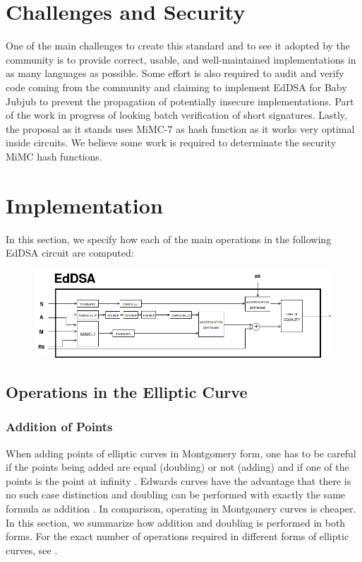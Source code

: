 \documentclass{article}
\begin{document}
\begin{spacing}{1.2}
\section{Challenges and Security}

One of the main challenges to create this standard and to see it adopted by the community is to provide correct, usable, and well-maintained implementations in as many languages as possible. 
%
Some effort is also required to audit and verify code coming from the community and claiming
to implement EdDSA for Baby Jubjub to prevent the propagation of potentially
insecure implementations. Part of the work in progress of looking batch verification of short signatures. 
%
Lastly, the proposal as it stands uses MiMC-7 as hash function as it works very optimal inside circuits. We believe some work is required to determinate the security MiMC hash functions. 
	
\section{Implementation}

In this section, we specify how each of the main operations in the following EdDSA circuit are computed:

	\begin{figure}[h]
		\centering
		\includegraphics[scale=0.4]{../../figures/circuit-eddsa.png}
	\end{figure}

	\subsection{Operations in the Elliptic Curve}
		\subsubsection{Addition of Points}

		When adding points of elliptic curves in Montgomery form, one has to be careful if the points being added are equal (doubling) or not (adding) and if one of the points is the point at infinity \cite{montgomery}. 
		Edwards curves have the advantage that there is no such case distinction and doubling can be performed with exactly the same formula as addition \cite{twisted}. 
		In comparison, operating in Montgomery curves is cheaper. In this section, we summarize how addition and doubling is performed in both forms. 
		For the exact number of operations required in different forms of elliptic curves, see \cite{twisted}.
		

\end{spacing}
\end{document}
